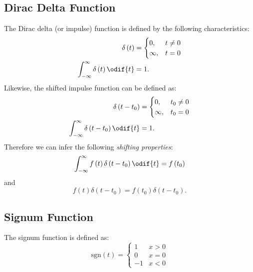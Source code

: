 \documentclass{article}
\begin{document}
\subsection{Dirac Delta Function}
The Dirac delta (or impulse) function is defined by the following characteristics:
\begin{align*}
    \delta\left( t \right)                                & = \begin{cases}
                                                                  0,      & t \neq 0 \\
                                                                  \infty, & t = 0
                                                              \end{cases} \\
    \int_{-\infty}^\infty \delta\left( t \right) \odif{t} & = 1.
\end{align*}
Likewise, the shifted impulse function can be defined as:
\begin{align*}
    \delta\left( t - t_0 \right)                                & = \begin{cases}
                                                                        0,      & t_0 \neq 0 \\
                                                                        \infty, & t_0 = 0
                                                                    \end{cases} \\
    \int_{-\infty}^\infty \delta\left( t - t_0 \right) \odif{t} & = 1.
\end{align*}
Therefore we can infer the following \textit{shifting properties}:
\begin{equation*}
    \int_{-\infty}^\infty f\left( t \right) \delta\left( t - t_0 \right) \odif{t} = f\left( t_0 \right)
\end{equation*}
and
\begin{equation*}
    f\left( t \right) \delta\left( t - t_0 \right) = f\left( t_0 \right) \delta\left( t - t_0 \right).
\end{equation*}
\subsection{Signum Function}
The signum function is defined as:
\begin{equation*}
    \mathrm{sgn}\left( t \right) = \begin{cases}
        1  & x > 0 \\
        0  & x = 0 \\
        -1 & x < 0
    \end{cases}
\end{equation*}
\end{document}
